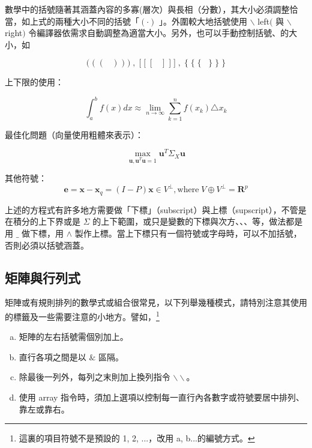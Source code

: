 \documentclass[12pt, a4paper]{article}
\begin{document}
數學中的括號隨著其涵蓋內容的多寡(層次）與長相（分數），其大小必須調整恰當，如上式的兩種大小不同的括號「$( \cdot)$ 」。外圍較大地括號使用 $\backslash$  left$($ 與 $\backslash$  right$)$ 令編譯器依需求自動調整為適當大小。另外，也可以手動控制括號、的大小，如

 $$ \bigg(\; \big( \;(\;\;\;) \;\big) \;\bigg) \;,\; \bigg[ \;\big[ \;[\;\;\;]\; \big]\; \bigg]\;,\; \bigg\{ \;\big\{ \;\{\;\;\;\} \;\big\} \;\bigg\}$$ 
  
  
  上下限的使用：
  
  $$\int_a^b f(x) dx \approx \lim_{n\rightarrow \infty}\sum_{k=1}^n f(x_k)\triangle x_k$$
  
  最佳化問題（向量使用粗體來表示）：
  
  $$\max_{\mathbf{u},\mathbf{u}^T\mathbf{u}=1} \mathbf{u}^T\Sigma_X\mathbf{u}$$
  
  其他符號：
  $$\mathbf{e}=\mathbf{x}-\mathbf{x}_q=(I-P)\mathbf{x} \in V^{\perp}, \mbox{where}\; V\oplus V^{\perp}=\mathbf{R}^p $$

 上述的方程式有許多地方需要做「下標」（subscript）與上標（supscript），不管是在積分的上下界或是 $\Sigma$ 的上下範圍，或只是變數的下標與次方、、、等，做法都是用  $\_$ 做下標，用 $\wedge$ 製作上標。當上下標只有一個符號或字母時，可以不加括號，否則必須以括號涵蓋。
 
\subsection{矩陣與行列式}
矩陣或有規則排列的數學式或組合很常見，以下列舉幾種模式，請特別注意其使用的標籤及一些需要注意的小地方。譬如，\footnote{這裏的項目符號不是預設的 1, 2, ...，改用 a, b...的編號方式。}
\begin{enumerate}[a)]
  \item 矩陣的左右括號需個別加上。
  \item 直行各項之間是以 $\&$ 區隔。
  \item 除最後一列外，每列之末則加上換列指令 $\backslash\backslash$。
  \item 使用 {\A array} 指令時，須加上選項以控制每一直行內各數字或符號要居中排列、靠左或靠右。
\end{enumerate}
\end{document}
